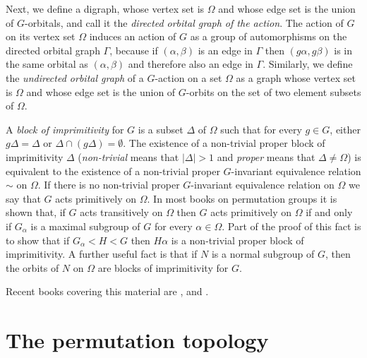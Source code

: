 \documentclass{emsprocart}
\theoremstyle{definition}
\begin{document}
Next, we define a digraph, whose vertex set is $\Omega$ and whose edge set is
the union of $G$-orbitals, and call it the \emph{directed orbital
graph of the action}.
The action of $G$ on its vertex set $\Omega$ induces an action of $G$ as a
group of automorphisms on the directed orbital graph $\Gamma$, because if
$(\alpha,\beta)$ is an edge in $\Gamma$ then $(g\alpha,g\beta)$ is
in the same orbital as $(\alpha,\beta)$ and therefore also an edge in $\Gamma$.
Similarly, we define the {\em undirected orbital graph} of a $G$-action on a
set $\Omega$ as a graph whose vertex set is $\Omega$ and whose edge set is the union of
$G$-orbits on the set of two element subsets of $\Omega$.

A {\em block of imprimitivity} for $G$ is a subset $\Delta$ of $\Omega$
such that for every $g\in G$, either $g\Delta=\Delta$ or $\Delta\cap
(g\Delta)=\emptyset$.  The existence of a non-trivial proper block of
imprimitivity $\Delta$ ({\em non-trivial} means that $|\Delta|>1$ and
{\em proper} means that $\Delta\neq \Omega$)
is equivalent to the existence of a
non-trivial proper $G$-invariant equivalence relation $\sim$ on
$\Omega$. If there is no non-trivial
proper $G$-invariant equivalence relation on $\Omega$ we say that $G$
acts primitively on $\Omega$.  In most books on permutation
groups it is shown that, if $G$ acts transitively on $\Omega$
then $G$ acts primitively on $\Omega$ if and only if $G_\alpha$ is a maximal
subgroup of $G$ for every $\alpha\in \Omega$.  Part of the proof of
this fact is to show that if $G_\alpha<H<G$ then $H\alpha$ is a
non-trivial proper block of imprimitivity.  A further useful fact
is that if $N$ is a
normal subgroup of $G$, then the orbits of $N$
on $\Omega$ are blocks of imprimitivity for $G$.

Recent books covering this material are
\cite{BMMN1997}, \cite{Cameron1999}  and \cite{DixonMortimer1996}.

\section{The permutation topology}
\end{document}
